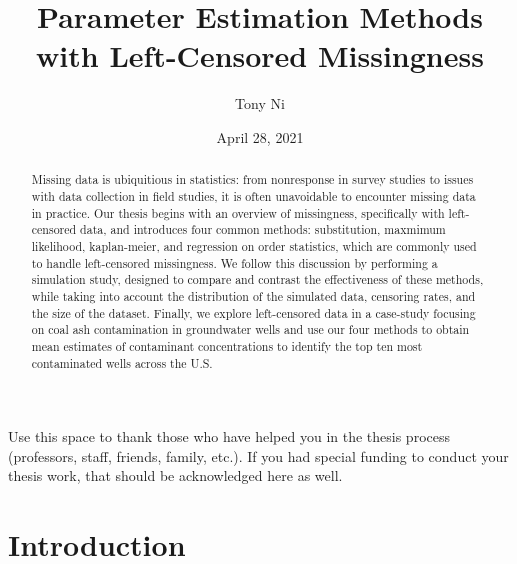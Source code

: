 \documentclass[12pt, twoside]{amherstthesis}
\title{Parameter Estimation Methods with Left-Censored Missingness}
\author{Tony Ni}
\date{April 28, 2021}
\begin{document}
\doublespace
  \maketitle

\frontmatter %
\pagestyle{fancyplain}

  \begin{abstract}
    Missing data is ubiquitious in statistics: from nonresponse in survey studies to issues with data collection in field studies, it is often unavoidable to encounter missing data in practice. Our thesis begins with an overview of missingness, specifically with
    left-censored data, and introduces four common methods: substitution, maxmimum likelihood, kaplan-meier, and regression on order statistics, which are commonly used to handle left-censored missingness. We follow this discussion by performing a simulation study, designed to compare and contrast the effectiveness of these methods, while taking into account the distribution of the simulated data, censoring rates, and the size of the dataset. Finally, we explore left-censored data in a case-study focusing on coal ash contamination in groundwater wells and use our four methods to obtain mean estimates of contaminant concentrations to identify the top ten most contaminated wells across the U.S.
  \end{abstract}
  \begin{acknowledgments}
    Use this space to thank those who have helped you in the thesis process (professors, staff, friends, family, etc.). If you had special funding to conduct your thesis work, that should be acknowledged here as well.
  \end{acknowledgments}

  \hypersetup{linkcolor=black}
  \setcounter{tocdepth}{2}
  \tableofcontents

  \listoftables

  \listoffigures


\mainmatter %
\pagestyle{fancyplain} %

\hypertarget{intro}{%
\chapter{Introduction}\label{intro}}
\end{document}

